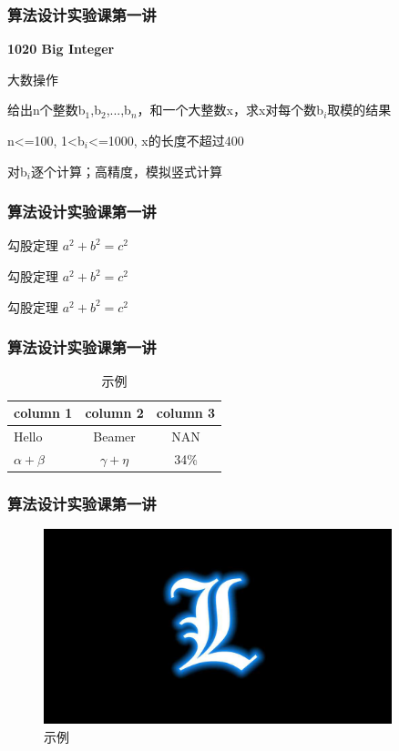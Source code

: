 \documentclass[mathserif,notheorems]{beamer}
\begin{document}
\begin{frame}
\frametitle{算法设计实验课第一讲}
\centerline{\bfseries\large\color{violet}1020 Big Integer}
\begin{description}
\linespread{2.5}   %
\item[算法类别] 大数操作
\item[题目大意] 给出n个整数b$_1$,b$_2$,...,b$_n$，和一个大整数x，求x对每个数b$_i$取模的结果
\item[范围要求] n<=100, 1<b$_i$<=1000, x的长度不超过400
\item[解题思路] 对b$_i$逐个计算；高精度，模拟竖式计算
\end{description}
\lstI
\end{frame}

\begin{frame}
\frametitle{算法设计实验课第一讲}
\begin{exampleblock}{勾股定理}
$a^2 + b^2 = c^2$
\end{exampleblock}
\begin{block}{勾股定理}
$a^2 + b^2 = c^2$
\end{block}
\begin{alertblock}{勾股定理}
$a^2 + b^2 = c^2$
\end{alertblock}
\end{frame}

\begin{frame}
\frametitle{算法设计实验课第一讲}
\begin{table}[tb]
\centering
\caption{示例\label{tab:tablename}}
\begin{tabular}{l|cc} \hline
\textbf{column 1} & \textbf{column 2} & \textbf{column 3} \\ \hline
Hello & Beamer & NAN \\ \hline
$\alpha+\beta$ & $\gamma+\eta$ & 34\% \\ \hline
\end{tabular}
\end{table}
\end{frame}

\begin{frame}
\frametitle{算法设计实验课第一讲}
\begin{figure}[tb]
\centering
\includegraphics[width=0.9\textwidth]{sample.jpg}
\caption{示例\label{fig:figure1}}
\end{figure}
\end{frame}
\end{document}
